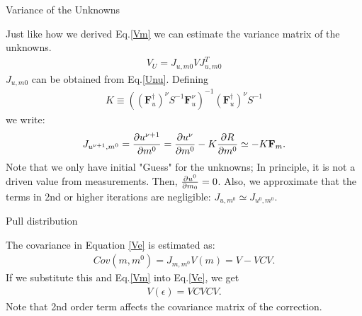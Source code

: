 \documentclass[
	xcolor=dvipsnames,
	aspectratio=169,	
	10pt, 
	]{beamer}
\begin{document}
\begin{frame}{Variance of the Unknowns}
	\begin{block}{}
		Just like how we derived  Eq.\eqref{Vm} we can estimate the variance matrix of the unknowns. 
		\begin{align}
			V_U = J_{u,m0} V J_{u,m0}^T
		\end{align}
		$J_{u,m0}$ can be obtained from Eq.\eqref{Unu}. Defining 
		\begin{align}
			K\equiv ((\mathbf{F}_u^\dagger)^\nu S^{-1}\mathbf F^\nu_u)^{-1}(\mathbf{F}_u^\dagger)^\nu S^{-1}
		\end{align}
		we write:
		\begin{align}
			J_{u^{\nu+1},m^0} = \frac{\partial u^{\nu+1}}{\partial m^0} = \frac{\partial u^{\nu}}{\partial m^0} - K\frac{\partial R}{\partial m^0} \simeq -K \mathbf{F}_m.
		\end{align}
		Note that we only have initial "Guess" for the unknowns; In principle, it is not a driven value from measurements. Then, $\frac{\partial u^0}{\partial m_0} = 0$. Also, we approximate that the terms in 2nd or higher iterations are negligible: $J_{u,m^0}\simeq J_{u^0,m^0}$.
	\end{block}
\end{frame}
\begin{frame}{Pull distribution}
	\begin{block}{}
		The covariance in Equation \eqref{Ve} is estimated as:
		\begin{align}
			Cov(m,m^0) = J_{m,m^0}V(m) = V - VCV.
		\end{align}
		If we substitute this and Eq.\eqref{Vm} into Eq.\eqref{Ve}, we get
		\begin{align}
			V(\epsilon) = VCVCV.
		\end{align}
		Note that 2nd order term affects the covariance matrix of the correction. 
	\end{block}
\end{frame}
\end{document}
